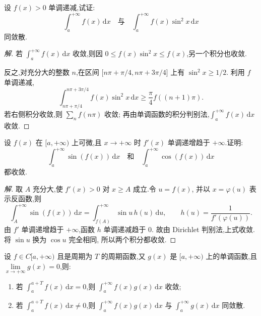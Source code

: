 \documentclass[../../数学分析培优讲义(答案版).tex]{subfiles}
\begin{document}
\begin{example}
设 $f(x)>0$ 单调递减,试证:
\[
    \int_a^{+\infty}f(x)\,\mathrm{d}x
    \quad\text{与}\quad
    \int_a^{+\infty}f(x)\sin^2x\,\mathrm{d}x
\]
同敛散.
\end{example}

\begin{proof}[解]
若 $\displaystyle\int_a^{+\infty}f(x)\,\mathrm{d}x$ 收敛,则因
$0\leq f(x)\sin^2x\leq f(x)$,另一个积分也收敛.

反之,对充分大的整数 $n$,在区间
$\lbrack n\pi+\pi/4,n\pi+3\pi/4\rbrack$ 上有 $\sin^2x\geq1/2$.
利用 $f$ 单调递减,
\[
    \int_{n\pi+\pi/4}^{n\pi+3\pi/4}f(x)\sin^2x\,\mathrm{d}x
    \geq\dfrac{\pi}{4}f((n+1)\pi).
\]
若右侧积分收敛,则 $\displaystyle\sum\limits_n f(n\pi)$ 收敛;
再由单调函数的积分判别法,$\displaystyle\int_a^{+\infty}f(x)\,\mathrm{d}x$ 收敛.
\end{proof}

\begin{example}
设 $f(x)$ 在 $\lbrack a,+\infty)$ 上可微,且 $x\to+\infty$ 时 $f'(x)$ 单调递增趋于 $+\infty$.证明:
\[
    \int_a^{+\infty}\sin(f(x))\,\mathrm{d}x
    \quad\text{和}\quad
    \int_a^{+\infty}\cos(f(x))\,\mathrm{d}x
\]
都收敛.
\end{example}

\begin{proof}[解]
取 $A$ 充分大,使 $f'(x)>0$ 对 $x\geq A$ 成立.令 $u=f(x)$,
并以 $x=\varphi(u)$ 表示反函数,则
\[
    \int_A^{+\infty}\sin(f(x))\,\mathrm{d}x
    =\int_{f(A)}^{+\infty}\sin u\,h(u)\,\mathrm{d}u,
    \qquad
    h(u)=\dfrac{1}{f'(\varphi(u))}.
\]
由 $f'$ 单调递增趋于 $+\infty$,函数 $h$ 单调递减趋于 $0$.
故由 Dirichlet 判别法,上式收敛.将 $\sin u$ 换为 $\cos u$ 完全相同,
所以两个积分都收敛.
\end{proof}

\begin{example}
设 $f\in C\lbrack a,+\infty)$ 且是周期为 $T$ 的周期函数,又 $g(x)$ 是 $\lbrack a,+\infty)$ 上的单调函数,且 $\displaystyle\lim\limits_{x\to+\infty}g(x)=0$,则:
\begin{enumerate}[label=(\arabic*)]
    \item 若 $\displaystyle\int_a^{a+T}f(x)\,\mathrm{d}x=0$,则 $\displaystyle\int_a^{+\infty}f(x)g(x)\,\mathrm{d}x$ 收敛;
    \item 若 $\displaystyle\int_a^{a+T}f(x)\,\mathrm{d}x\neq0$,则 $\displaystyle\int_a^{+\infty}f(x)g(x)\,\mathrm{d}x$ 与 $\displaystyle\int_a^{+\infty}g(x)\,\mathrm{d}x$ 同敛散.
\end{enumerate}
\end{example}
\end{document}
